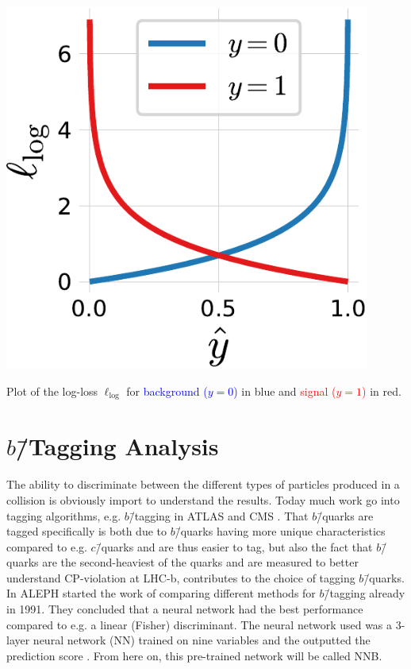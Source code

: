 \begin{marginfigure}[-5cm]
  \includegraphics[draft=false, width=0.9\textwidth]{figures/log_loss_cross_entropy/logloss.pdf}
  \caption[Plot of the log-loss $\ell_\mathrm{log}$]
          {Plot of the log-loss $\ell_\mathrm{log}$ for \textcolor{blue}{background ($y=0$)} in blue and \textcolor{red}{signal ($y=1$)} in red.} 
  \label{fig:q:logloss}
\end{marginfigure}

\FloatBarrier
\section[b-Tagging Analysis]{$b$\=/Tagging Analysis}
\label{sec:q:b_tagging_analysis}

The ability to discriminate between the different types of particles produced in a collision is obviously import to understand the results. Today much work go into tagging algorithms, e.g. $b$\=/tagging in ATLAS and CMS \autocite{scodellaroTaggingATLASCMS2017}. That $b$\=/quarks are tagged specifically is both due to $b$\=/quarks having more unique characteristics compared to e.g. $c$\=/quarks and are thus easier to tag, but also the fact that $b$\=/quarks are the second-heaviest of the quarks and are measured to better understand CP-violation at LHC-b, contributes to the choice of tagging $b$\=/quarks. In ALEPH \citet{proriolTAGGINGQUARKEVENTS1991} started the work of comparing different methods for $b$\=/tagging already in \num{1991}. They concluded that a neural network had the best performance compared to e.g. a linear (Fisher) discriminant. The neural network used was a 3-layer neural network (NN) trained on nine variables and the outputted the prediction score . From here on, this pre-trained network will be called NNB. 

